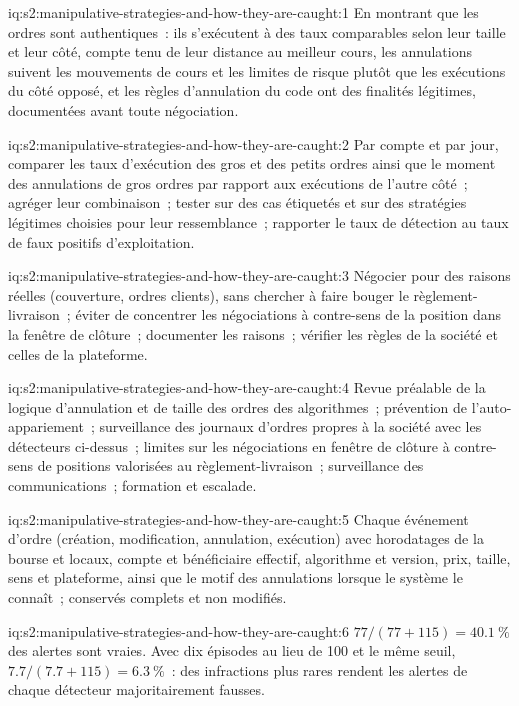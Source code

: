 \begin{solution}{iq:s2:manipulative-strategies-and-how-they-are-caught:1}
En montrant que les ordres sont authentiques~: ils s'exécutent à des taux comparables selon leur taille et leur côté, compte tenu de leur distance au meilleur cours, les annulations suivent les mouvements de cours
et les limites de risque plutôt que les exécutions du côté opposé, et les règles d'annulation du code ont des finalités légitimes, documentées avant toute négociation.
\end{solution}

\begin{solution}{iq:s2:manipulative-strategies-and-how-they-are-caught:2}
Par compte et par jour, comparer les taux d'exécution des gros et des petits ordres ainsi que le moment des annulations de gros ordres par rapport aux exécutions de l'autre côté~; agréger
leur combinaison~; tester sur des cas étiquetés et sur des stratégies légitimes choisies pour leur ressemblance~; rapporter le taux de détection au taux de faux
positifs d'exploitation.
\end{solution}

\begin{solution}{iq:s2:manipulative-strategies-and-how-they-are-caught:3}
Négocier pour des raisons réelles (couverture, ordres clients), sans chercher à faire bouger le règlement-livraison~; éviter de concentrer les négociations à contre-sens de la position dans
la fenêtre de clôture~; documenter les raisons~; vérifier les règles de la société et celles de la plateforme.
\end{solution}

\begin{solution}{iq:s2:manipulative-strategies-and-how-they-are-caught:4}
Revue préalable de la logique d'annulation et de taille des ordres des algorithmes~; prévention de l'auto-appariement~; surveillance des journaux d'ordres propres à la société avec les détecteurs
ci-dessus~; limites sur les négociations en fenêtre de clôture à contre-sens de positions valorisées au règlement-livraison~; surveillance des communications~; formation et escalade.
\end{solution}

\begin{solution}{iq:s2:manipulative-strategies-and-how-they-are-caught:5}
Chaque événement d'ordre (création, modification, annulation, exécution) avec horodatages de la bourse et locaux, compte et bénéficiaire effectif, algorithme et version, prix, taille,
sens et plateforme, ainsi que le motif des annulations lorsque le système le connaît~; conservés complets et non modifiés.
\end{solution}

\begin{solution}{iq:s2:manipulative-strategies-and-how-they-are-caught:6}
$77/(77 + 115) = 40.1~\%$ des alertes sont vraies. Avec dix épisodes au lieu de 100 et le même seuil, $7.7/(7.7 + 115) = 6.3~\%$~: des infractions plus rares rendent
les alertes de chaque détecteur majoritairement fausses.
\end{solution}
